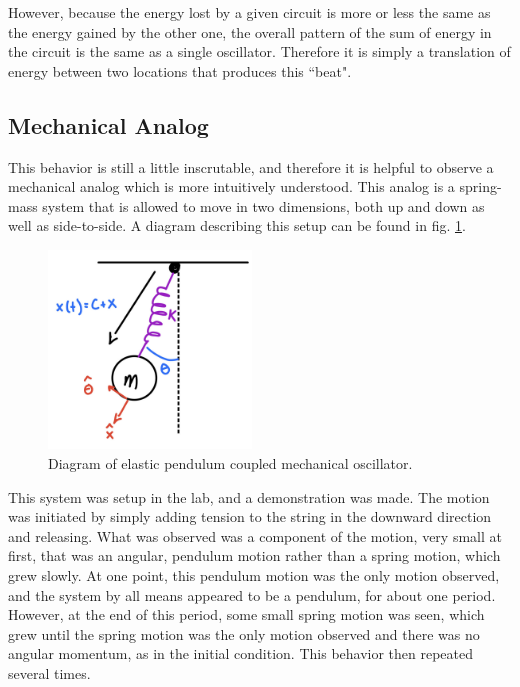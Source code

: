 \documentclass[aps,prl,reprint]{revtex4-2}
\begin{document}
However, because the energy lost by a given circuit is more or less the same
as the energy gained by the other one, the overall pattern of the sum of
energy in the circuit is the same as a single oscillator. Therefore it is
simply a translation of energy between two locations that produces this
``beat". \\

\subsection{Mechanical Analog}

This behavior is still a little inscrutable, and therefore it is
helpful to observe a mechanical analog which is more intuitively understood. 
This analog is a spring-mass system that is allowed to move in two dimensions, 
both up and down as well as side-to-side. A diagram describing this setup
can be found in fig. \ref{elastic pendulum}.

\begin{figure}[h]
\includegraphics[width=0.48\textwidth]{../Images/l6_ElasticPendulum.jpg}
\caption{\label{elastic pendulum} Diagram of elastic pendulum coupled
mechanical oscillator.}
\end{figure}

This system was setup in the lab, and a demonstration was made. The motion
was initiated by simply adding tension to the string in the downward direction
and releasing. What was observed was a component of the motion, very small at
first, that was an angular, pendulum motion rather than a spring motion,
which grew slowly. At one point, this pendulum motion was the only motion 
observed, and the system by all means appeared to be a pendulum, for
about one period. However, at the end of this period, some small spring
motion was seen, which grew until the spring motion was the only motion
observed and there was no angular momentum, as in the initial condition.
This behavior then repeated several times. \\
\end{document}
